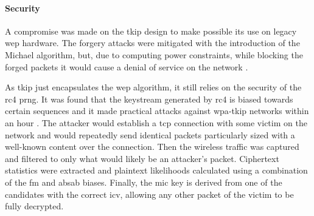 \paragraph{Security}

A compromise was made on the \gls{tkip} design to make possible its use on legacy \gls{wep} hardware. The forgery attacks were mitigated with the introduction of the Michael algorithm, but, due to computing power constraints, while blocking the forged packets it would cause a denial of service on the network \cite{ieee_80211_2020}.

As \gls{tkip} just encapsulates the \gls{wep} algorithm, it still relies on the security of the \gls{rc4} \gls{prng}. It was found that the keystream generated by \gls{rc4} is biased towards certain sequences and it made practical attacks against \gls{wpa}-\gls{tkip} networks within an hour \cite{rc4nomore}. The attacker would establish a \gls{tcp} connection with some victim on the network and would repeatedly send identical packets particularly sized with a well-known content over the connection. Then the wireless traffic was captured and filtered to only what would likely be an attacker's packet. Ciphertext statistics were extracted and plaintext likelihoods calculated using a combination of the \gls{fm} and \gls{absab} biases. Finally, the \gls{mic} key is derived from one of the candidates with the correct \gls{icv}, allowing any other packet of the victim to be fully decrypted.
